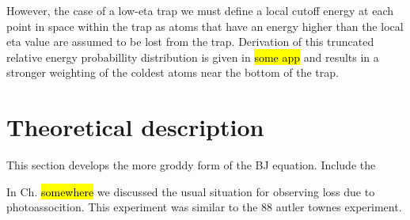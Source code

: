 However, the case of a low-eta trap we must define a local cutoff energy at each point in space within the trap as atoms that have an energy higher than the local eta value are assumed to be lost from the trap. Derivation of this truncated relative energy probabillity distribution is given in \hl{some app} and results in a stronger weighting of the coldest atoms near the bottom of the trap.



\section{Theoretical description}
\label{sec:lowE_theory}

This section develops the more groddy form of the BJ equation. Include the 

In Ch. \hl{somewhere} we discussed the usual situation for observing loss due to photoassocition. This experiment was similar to the 88 autler townes experiment. 

